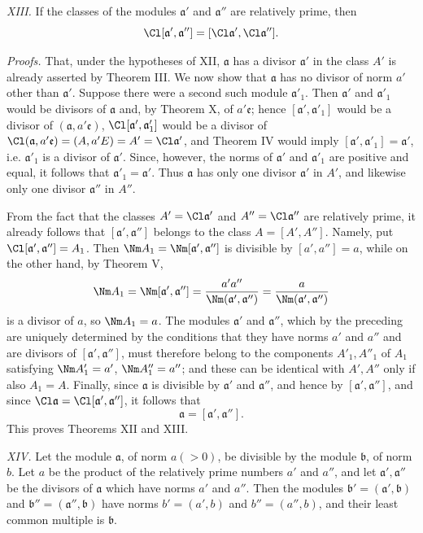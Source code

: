 \emph{XIII.} If the classes of the modules $\mathfrak a'$ and $\mathfrak a''$ are relatively prime, then
\[
 \Cl[\mathfrak a',\mathfrak a'']=[\Cl\mathfrak a',\Cl\mathfrak a''].
\]

\emph{Proofs.} That, under the hypotheses of XII, $\mathfrak a$ has a divisor $\mathfrak a'$ in the class $A'$ is already asserted by Theorem III. We now show that $\mathfrak a$ has no divisor of norm $a'$ other than $\mathfrak a'$. Suppose there were a second such module $\mathfrak a'_1$. Then $\mathfrak a'$ and $\mathfrak a'_1$ would be divisors of $\mathfrak a$ and, by Theorem X, of $a'\mathfrak e$; hence $[\mathfrak a',\mathfrak a'_1]$ would be a divisor of $(\mathfrak a,a'\mathfrak e)$, $\Cl[\mathfrak a',\mathfrak a'_1]$ would be a divisor of $\Cl(\mathfrak a,a'\mathfrak e)=(A,a'E)=A'=\Cl\mathfrak a'$, and Theorem IV would imply $[\mathfrak a',\mathfrak a'_1]=\mathfrak a'$, i.e. $\mathfrak a'_1$ is a divisor of $\mathfrak a'$. Since, however, the norms of $\mathfrak a'$ and $\mathfrak a'_1$ are positive and equal, it follows that $\mathfrak a'_1=\mathfrak a'$. Thus $\mathfrak a$ has only one divisor $\mathfrak a'$ in $A'$, and likewise only one divisor $\mathfrak a''$ in $A''$.

From the fact that the classes $A'=\Cl\mathfrak a'$ and $A''=\Cl\mathfrak a''$ are relatively prime, it already follows that $[\mathfrak a',\mathfrak a'']$ belongs to the class $A=[A',A'']$. Namely, put $\Cl[\mathfrak a',\mathfrak a'']=A_1$. Then $\Nm A_1=\Nm[\mathfrak a',\mathfrak a'']$ is divisible by $[a',a'']=a$, while on the other hand, by Theorem V,
\[
 \Nm A_1=\Nm[\mathfrak a',\mathfrak a'']
 ={a'a''\over \Nm(\mathfrak a',\mathfrak a'')}
 ={a\over \Nm(\mathfrak a',\mathfrak a'')}
\]
is a divisor of $a$, so $\Nm A_1=a$. The modules $\mathfrak a'$ and $\mathfrak a''$, which by the preceding are uniquely determined by the conditions that they have norms $a'$ and $a''$ and are divisors of $[\mathfrak a',\mathfrak a'']$, must therefore belong to the components $A'_1,A''_1$ of $A_1$ satisfying $\Nm A'_1=a'$, $\Nm A''_1=a''$; and these can be identical with $A',A''$ only if also $A_1=A$. Finally, since $\mathfrak a$ is divisible by $\mathfrak a'$ and $\mathfrak a''$, and hence by $[\mathfrak a',\mathfrak a'']$, and since $\Cl\mathfrak a=\Cl[\mathfrak a',\mathfrak a'']$, it follows that
\[
 \mathfrak a=[\mathfrak a',\mathfrak a''].
\]
This proves Theorems XII and XIII.

\emph{XIV.} Let the module $\mathfrak a$, of norm $a(>0)$, be divisible by the module $\mathfrak b$, of norm $b$. Let $a$ be the product of the relatively prime numbers $a'$ and $a''$, and let $\mathfrak a',\mathfrak a''$ be the divisors of $\mathfrak a$ which have norms $a'$ and $a''$. Then the modules $\mathfrak b'=(\mathfrak a',\mathfrak b)$ and $\mathfrak b''=(\mathfrak a'',\mathfrak b)$ have norms $b'=(a',b)$ and $b''=(a'',b)$, and their least common multiple is $\mathfrak b$.

